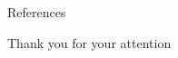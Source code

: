 \documentclass[english]{beamer}\usepackage[]{graphicx}\usepackage[]{xcolor}
\begin{document}
% 
% 
% 
% 

\begin{frame}{References}
  \small
  

\end{frame}


\begin{frame}{Thank you for your attention}

\end{frame}


\end{document}
